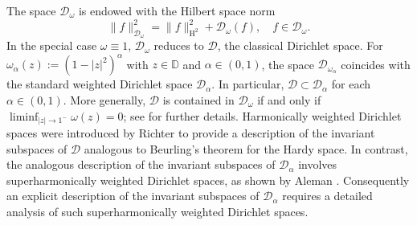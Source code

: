 \documentclass[12pt,reqno,a4paper]{amsart}
\newcommand{\hH}{\mathrm{H^2 }}
\newcommand{\cD}{{\mathcal{D}}}
\numberwithin{equation}{section}
\begin{document}
The space \(\cD_\omega\) is endowed with the Hilbert space norm 
\[
\|f\|_{\cD_\omega}^2 = \|f\|_{\hH}^2 + \cD_\omega(f), \quad f \in \cD_\omega.
\]
In the special case $\omega \equiv 1$, $\mathcal{D}_\omega$ reduces to $\mathcal{D}$, the classical Dirichlet space. 
For \( \omega_\alpha(z) := (1 - |z|^2)^\alpha\) with \(z \in \mathbb{D}\) and \(\alpha \in (0, 1)\), the space \(\cD_{\omega_\alpha}\) coincides with %
the standard weighted Dirichlet space \(\cD_\alpha\). In particular, \(\cD \subset \cD_\alpha\) for each \(\alpha \in (0,1)\). More generally, \(\cD\) is contained in \(\cD_\omega\) if and only if \(\liminf_{|z| \to 1^-} \omega(z) = 0\); see \cite{BE_0} for further details. 
Harmonically weighted Dirichlet spaces were introduced by Richter \cite{Ri1} to provide a description of the invariant subspaces of $\cD$ analogous to Beurling's theorem for the Hardy space. 
%
In contrast, the analogous description of the invariant subspaces of $\mathcal{D}_\alpha$ involves superharmonically weighted Dirichlet spaces, as shown by Aleman \cite{Al}. Consequently an explicit description of the invariant subspaces of $\cD_\alpha$ requires a detailed analysis of such superharmonically weighted Dirichlet spaces.
\end{document}

